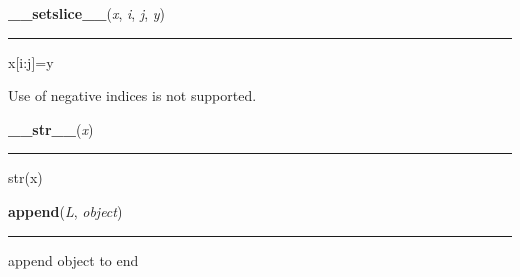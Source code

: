     \begin{boxedminipage}{\textwidth}

    \raggedright \textbf{\_\_setslice\_\_}(\textit{x}, \textit{i}, \textit{j}, \textit{y})

    \vspace{-1.5ex}

    \rule{\textwidth}{0.5\fboxrule}

x{[}i:j{]}=y

Use  of negative indices is not supported.
    \vspace{1ex}

    \end{boxedminipage}

    \label{object:__str__}

    \vspace{0.5ex}

    \begin{boxedminipage}{\textwidth}

    \raggedright \textbf{\_\_str\_\_}(\textit{x})

    \vspace{-1.5ex}

    \rule{\textwidth}{0.5\fboxrule}

str(x)
    \vspace{1ex}

    \end{boxedminipage}

    \label{list:append}

    \vspace{0.5ex}

    \begin{boxedminipage}{\textwidth}

    \raggedright \textbf{append}(\textit{L}, \textit{object})

    \vspace{-1.5ex}

    \rule{\textwidth}{0.5\fboxrule}

append object to end
    \vspace{1ex}

    \end{boxedminipage}

    \label{list:count}

    \vspace{0.5ex}

